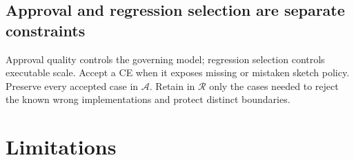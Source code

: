 \documentclass[11pt]{article}
\newcommand{\archive}{\mathcal{A}}
\newcommand{\regression}{\mathcal{R}}
\begin{document}
\subsection{Approval and regression selection are separate constraints}

Approval quality controls the governing model; regression selection controls executable scale.
Accept a CE when it exposes missing or mistaken sketch policy.  Preserve every accepted case in
$\archive$.  Retain in $\regression$ only the cases needed to reject the
known wrong implementations and protect distinct boundaries.

\section{Limitations}
\label{sec:limitations}
\end{document}
